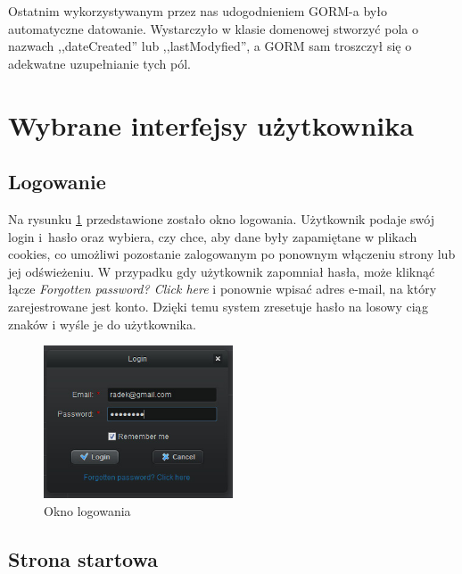 \hspace{15pt}Ostatnim wykorzystywanym przez nas udogodnieniem GORM-a było automatyczne datowanie. Wystarczyło w klasie domenowej stworzyć pola o nazwach ,,dateCreated'' lub ,,lastModyfied'', a GORM sam troszczył się o adekwatne uzupełnianie tych pól.


\clearpage
\section{Wybrane interfejsy użytkownika}
\label{sec:interfejsy}

\subsection*{Logowanie}
\label{sec:login}
\hspace{15pt}Na rysunku \ref{fig:login} przedstawione zostało okno logowania. Użytkownik podaje swój login i~hasło oraz wybiera, czy chce, aby dane były zapamiętane w plikach cookies, co umożliwi pozostanie zalogowanym po ponownym włączeniu strony lub jej odświeżeniu. W przypadku gdy użytkownik zapomniał hasła, może kliknąć łącze \emph{Forgotten password? Click here} i ponownie wpisać adres e-mail, na który zarejestrowane jest konto. Dzięki temu system zresetuje hasło na losowy ciąg znaków i wyśle je do użytkownika.

\begin{figure}[h!]
\centering
\includegraphics[width=0.5\textwidth]{./img/interfejsy/login2}
\caption{Okno logowania}
\label{fig:login}
\end{figure}

\subsection*{Strona startowa}
\label{sec:start_page}

